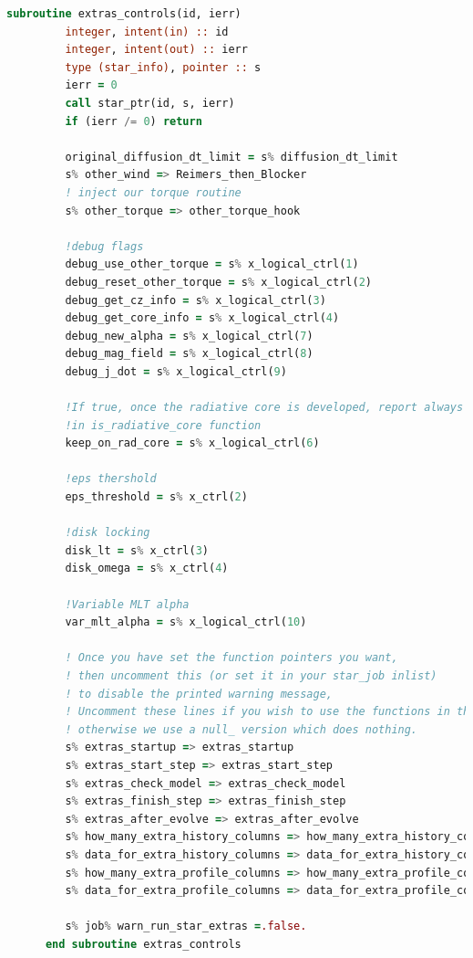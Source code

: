 \begin{lstlisting}[language=Fortran, float, caption={Rutina de inicialización de las simulacions.}, label={lst:extras_ctrl}]
      subroutine extras_controls(id, ierr)
         integer, intent(in) :: id
         integer, intent(out) :: ierr
         type (star_info), pointer :: s
         ierr = 0
         call star_ptr(id, s, ierr)
         if (ierr /= 0) return
         
         original_diffusion_dt_limit = s% diffusion_dt_limit
         s% other_wind => Reimers_then_Blocker
         ! inject our torque routine
         s% other_torque => other_torque_hook

         !debug flags
         debug_use_other_torque = s% x_logical_ctrl(1)
         debug_reset_other_torque = s% x_logical_ctrl(2)
         debug_get_cz_info = s% x_logical_ctrl(3)
         debug_get_core_info = s% x_logical_ctrl(4)
         debug_new_alpha = s% x_logical_ctrl(7)
         debug_mag_field = s% x_logical_ctrl(8)
         debug_j_dot = s% x_logical_ctrl(9)

         !If true, once the radiative core is developed, report always true
         !in is_radiative_core function
         keep_on_rad_core = s% x_logical_ctrl(6)

         !eps thershold
         eps_threshold = s% x_ctrl(2)

         !disk locking
         disk_lt = s% x_ctrl(3)
         disk_omega = s% x_ctrl(4)

         !Variable MLT alpha
         var_mlt_alpha = s% x_logical_ctrl(10)
      
         ! Once you have set the function pointers you want,
         ! then uncomment this (or set it in your star_job inlist)
         ! to disable the printed warning message,
         ! Uncomment these lines if you wish to use the functions in this file,
         ! otherwise we use a null_ version which does nothing.
         s% extras_startup => extras_startup
         s% extras_start_step => extras_start_step
         s% extras_check_model => extras_check_model         
         s% extras_finish_step => extras_finish_step
         s% extras_after_evolve => extras_after_evolve
         s% how_many_extra_history_columns => how_many_extra_history_columns
         s% data_for_extra_history_columns => data_for_extra_history_columns
         s% how_many_extra_profile_columns => how_many_extra_profile_columns
         s% data_for_extra_profile_columns => data_for_extra_profile_columns  
         
         s% job% warn_run_star_extras =.false.             
      end subroutine extras_controls
\end{lstlisting}

